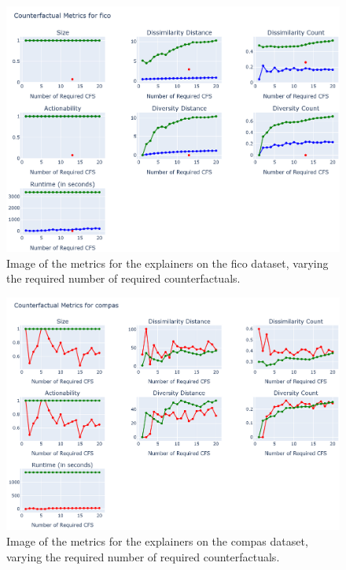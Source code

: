 \begin{figure}[!htbp]
    \centering
    \includegraphics[width=\textwidth]{images/metrics-fico.png}
    \caption{Image of the metrics for the explainers on the fico dataset, varying the required number of
required counterfactuals.}
    \label{fig:metrics-fico}
\end{figure}
\begin{figure}[!htbp]
    \centering
    \includegraphics[width=\textwidth]{images/metrics-compas.png}
    \caption{Image of the metrics for the explainers on the compas dataset, varying the required number of
required counterfactuals.}
    \label{fig:metrics-compas}
\end{figure}

